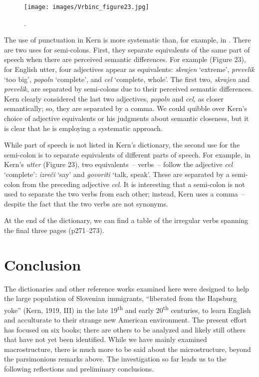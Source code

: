 \documentclass[output=paper,colorlinks,citecolor=brown,arabicfont,chinesefont]{langscibook}
\begin{document}
\begin{figure}
\texttt{[image: images/Vrbinc\_figure23.jpg]}
\caption{\citealt[258]{Kern1919}.}
\label{Figure 23}
\end{figure}

The use of punctuation in Kern is more systematic than, for example, in \citet{Kosutnik1912}. There are two uses for semi-colons. First, they separate equivalents of the same part of speech when there are perceived semantic differences. For example (Figure 23), for English utter, four adjectives appear as equivalents: \emph{skrajen} ‘extreme’, \emph{prevelik} ‘too big’, \emph{popoln} ‘complete’, and \emph{cel} ‘complete, whole’. The first two, \emph{skrajen} and \emph{prevelik}, are separated by semi-colons due to their perceived semantic differences. Kern clearly considered the last two adjectives, \emph{popoln} and \emph{cel}, as closer semantically; so, they are separated by a comma. We could quibble over Kern’s choice of adjective equivalents or his judgments about semantic closeness, but it is clear that he is employing a systematic approach. 

While part of speech is not listed in Kern’s dictionary, the second use for the semi-colon is to separate equivalents of different parts of speech. For example, in Kern’s \emph{utter} (Figure 23), two equivalents~-- verbs~-- follow the adjective \emph{cel} ‘complete’: \emph{izreči} ‘say’ and \emph{govoriti} ‘talk, speak’. These are separated by a semi-colon from the preceding adjective \emph{cel}. It is interesting that a semi-colon is not used to separate the two verbs from each other; instead, Kern uses a comma~-- despite the fact that the two verbs are not synonyms. 

At the end of the dictionary, we can find a table of the irregular verbs spanning the final three pages (p271–273).

\section{Conclusion}

The dictionaries and other reference works examined here were designed to help the large population of Slovenian immigrants, “liberated from the Hapsburg yoke” (Kern, 1919, III) in the late 19\textsuperscript{th} and early 20\textsuperscript{th} centuries, to learn English and acculturate to their strange new American environment. The present effort has focused on six books; there are others to be analyzed and likely still others that have not yet been identified. While we have mainly examined macrostructure, there is much more to be said about the microstructure, beyond the parsimonious remarks above. The investigation so far leads us to the following reflections and preliminary conclusions.
\end{document}
